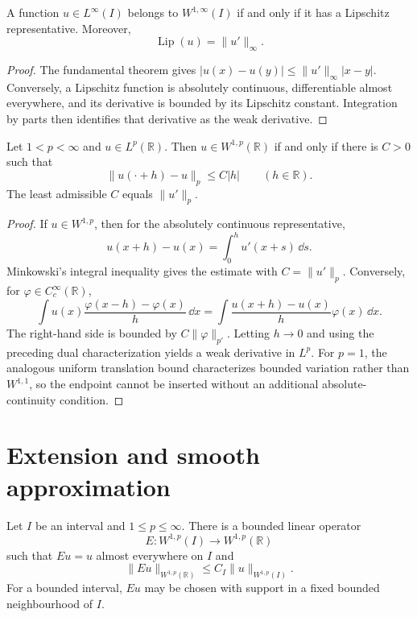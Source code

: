 \begin{notetheorem}
A function $u\in L^\infty(I)$ belongs to $W^{1,\infty}(I)$ if and only if it
has a Lipschitz representative.  Moreover,
\[
  \operatorname{Lip}(u)=\|u'\|_\infty.
\]
\end{notetheorem}

\begin{proof}
The fundamental theorem gives
$|u(x)-u(y)|\le\|u'\|_\infty|x-y|$.  Conversely, a Lipschitz function is
absolutely continuous, differentiable almost everywhere, and its derivative
is bounded by its Lipschitz constant.  Integration by parts then identifies
that derivative as the weak derivative.
\end{proof}

\begin{notetheorem}
Let $1<p<\infty$ and $u\in L^p(\mathbb R)$.  Then $u\in W^{1,p}(\mathbb R)$
if and only if there is $C>0$ such that
\[
  \|u(\cdot+h)-u\|_p\le C|h|
  \qquad(h\in\mathbb R).
\]
The least admissible $C$ equals $\|u'\|_p$.
\end{notetheorem}

\begin{proof}
If $u\in W^{1,p}$, then for the absolutely continuous representative,
\[
  u(x+h)-u(x)=\int_0^h u'(x+s)\,\dd s.
\]
Minkowski's integral inequality gives the estimate with $C=\|u'\|_p$.
Conversely, for $\varphi\in C_c^\infty(\mathbb R)$,
\[
  \int u(x)\frac{\varphi(x-h)-\varphi(x)}{h}\,\dd x
  =\int\frac{u(x+h)-u(x)}{h}\varphi(x)\,\dd x.
\]
The right-hand side is bounded by $C\|\varphi\|_{p'}$.  Letting $h\to0$ and
using the preceding dual characterization yields a weak derivative in $L^p$.
For $p=1$, the analogous uniform translation bound characterizes bounded
variation rather than $W^{1,1}$, so the endpoint cannot be inserted without
an additional absolute-continuity condition.
\end{proof}

\section{Extension and smooth approximation}

\begin{notetheorem}
Let $I$ be an interval and $1\le p\le\infty$.  There is a bounded linear
operator
\[
  E\colon W^{1,p}(I)\to W^{1,p}(\mathbb R)
\]
such that $Eu=u$ almost everywhere on $I$ and
\[
  \|Eu\|_{W^{1,p}(\mathbb R)}
  \le C_I\|u\|_{W^{1,p}(I)}.
\]
For a bounded interval, $Eu$ may be chosen with support in a fixed bounded
neighbourhood of $I$.
\end{notetheorem}

